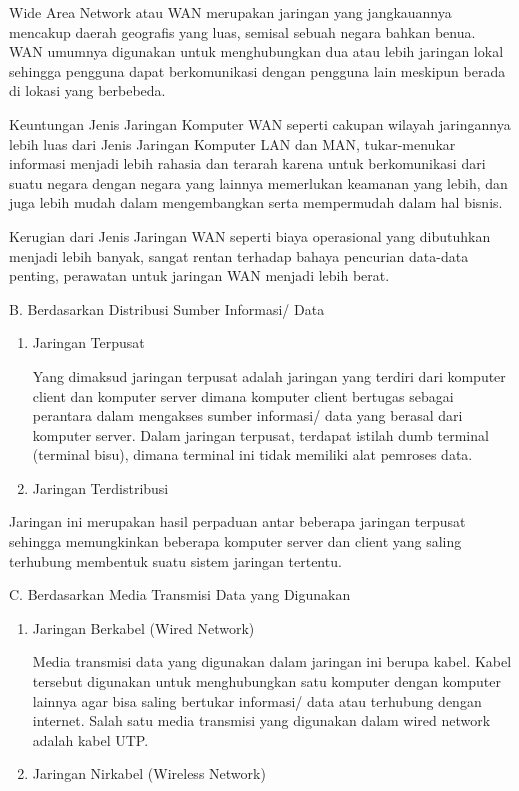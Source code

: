  \par
Wide Area Network atau WAN merupakan jaringan yang jangkauannya mencakup daerah geografis yang luas, semisal sebuah negara bahkan benua. WAN umumnya digunakan untuk menghubungkan dua atau lebih jaringan lokal sehingga pengguna dapat berkomunikasi dengan pengguna lain meskipun berada di lokasi yang berbebeda. \par
\vspace{12pt}
Keuntungan Jenis Jaringan Komputer WAN seperti cakupan wilayah jaringannya lebih luas dari Jenis Jaringan Komputer LAN dan MAN, tukar-menukar informasi menjadi lebih rahasia dan terarah karena untuk berkomunikasi dari suatu negara dengan negara yang lainnya memerlukan keamanan yang lebih, dan juga lebih mudah dalam mengembangkan serta mempermudah dalam hal bisnis. \par
Kerugian dari Jenis Jaringan WAN seperti biaya operasional yang dibutuhkan menjadi lebih banyak, sangat rentan terhadap bahaya pencurian data-data penting, perawatan untuk jaringan WAN menjadi lebih berat. \par
\vspace{12pt}
\noindent 
B. Berdasarkan Distribusi Sumber Informasi/ Data \par
\noindent 
\begin{enumerate}
\item Jaringan Terpusat \par
Yang dimaksud jaringan terpusat adalah jaringan yang terdiri dari komputer client dan komputer server dimana komputer client bertugas sebagai perantara dalam mengakses sumber informasi/ data yang berasal dari komputer server. Dalam jaringan terpusat, terdapat istilah dumb terminal (terminal bisu), dimana terminal ini tidak memiliki alat pemroses data. \par
\vspace{12pt}
\noindent 
\item Jaringan Terdistribusi\end{enumerate}
 \par
Jaringan ini merupakan hasil perpaduan antar beberapa jaringan terpusat sehingga memungkinkan beberapa komputer server dan client yang saling terhubung membentuk suatu sistem jaringan tertentu. \par
\vspace{12pt}
\noindent 
C. Berdasarkan Media Transmisi Data yang Digunakan \par
\noindent 
\begin{enumerate}
\item Jaringan Berkabel (Wired Network) \par
Media transmisi data yang digunakan dalam jaringan ini berupa kabel. Kabel tersebut digunakan untuk menghubungkan satu komputer dengan komputer lainnya agar bisa saling bertukar informasi/ data atau terhubung dengan internet. Salah satu media transmisi yang digunakan dalam wired network adalah kabel UTP. \par
\vspace{12pt}
\noindent 
\item Jaringan Nirkabel (Wireless Network)\end{enumerate}
